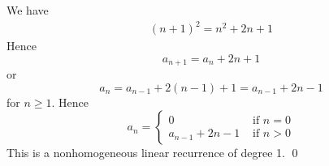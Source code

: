 We have
\begin{align*}
(n+1)^2 = n^2 + 2n + 1
\end{align*}
Hence
\[
a_{n + 1} = a_n + 2n + 1
\]
or
\[
a_{n} = a_{n - 1} + 2(n - 1) + 1 = a_{n - 1} + 2n - 1
\]
for $n \geq 1$.
Hence
\[
a_n =
\begin{cases}
  0                 & \text{ if } n = 0 \\
  a_{n - 1} + 2n - 1 & \text{ if } n > 0 
\end{cases}
\]
This is a nonhomogeneous linear recurrence of degree 1.
\qed
